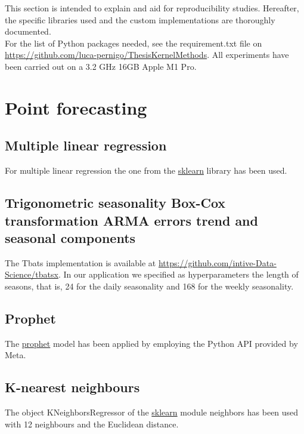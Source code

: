 This section is intended to explain and aid for reproducibility studies. Hereafter, the specific libraries used and the custom implementations are thoroughly documented.
\\
For the list of Python packages needed, see the requirement.txt file on \url{https://github.com/luca-pernigo/ThesisKernelMethods}\label{github_repo}.
All experiments have been carried out on a 3.2 GHz 16GB Apple M1 Pro.







\section{Point forecasting}
\subsection{Multiple linear regression}
For multiple linear regression the one from the \href{https://scikit-learn.org/stable/}{sklearn} library has been used.

\subsection{Trigonometric seasonality Box-Cox transformation ARMA errors trend and seasonal components}
The Tbats implementation is available at \href{https://github.com/intive-DataScience/tbats}{https://github.com/intive-Data-Science/tbatsx}.
In our application we specified as hyperparameters the length of seasons, that is, 24 for the daily seasonality and 168 for the weekly seasonality.

\subsection{Prophet}
The \href{https://facebook.github.io/prophet/docs/quick_start.html}{prophet} model has been applied by employing the Python API provided by Meta.

\subsection{K-nearest neighbours}
The object KNeighborsRegressor of the \href{https://scikit-learn.org/stable/}{sklearn} module neighbors has been used with 12 neighbours and the Euclidean distance.

